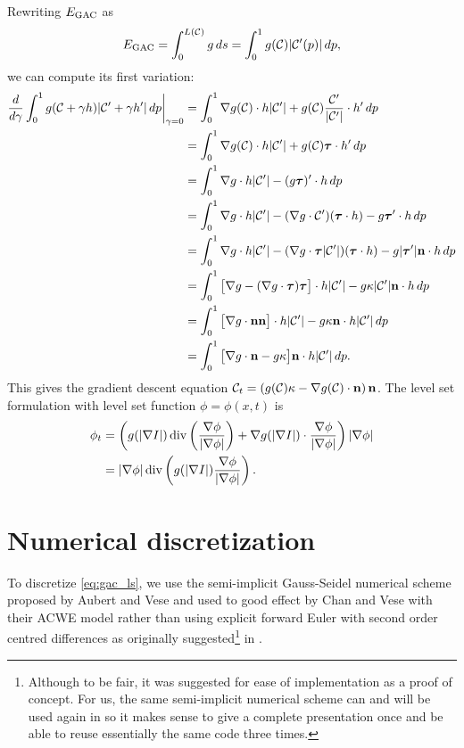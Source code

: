 Rewriting $E_\textrm{GAC}$ as 
\begin{align*}
E_\textrm{GAC} = \int^{L(\mathcal{C})}_0 g \, ds 
= \int^1_0 g(\mathcal{C}) \lvert\mathcal{C}'(p)\rvert \, dp ,
\end{align*} 
we can compute its first variation: 
\begin{align*}
\frac{d}{d\gamma} \int^1_0 g(\mathcal{C} + \gamma h) \lvert\mathcal{C}' + \gamma h'\rvert \, dp \bigg\rvert_{\gamma = 0}
&=  \int^1_0 \nabla g(\mathcal{C}) \cdot h \lvert\mathcal{C}'\rvert + g(\mathcal{C}) \frac{\mathcal{C}'}{\lvert\mathcal{C}'\rvert} \cdot h' \,dp 
\\
&=\int^1_0 \nabla g(\mathcal{C}) \cdot h \lvert\mathcal{C}'\rvert + g(\mathcal{C}) \boldsymbol{\tau} \cdot h' \,dp 
\\
&=\int^1_0 \nabla g \cdot h \lvert\mathcal{C}'\rvert - ( g \boldsymbol{\tau})' \cdot h \, dp
\\
&=\int^1_0 \nabla g \cdot h \lvert\mathcal{C}'\rvert - (\nabla g \cdot \mathcal{C}')(\boldsymbol{\tau} \cdot h) - g\boldsymbol{\tau} ' \cdot h \, dp
\\
&=\int^1_0 \nabla g \cdot h \lvert\mathcal{C}'\rvert - (\nabla g \cdot \boldsymbol{\tau} \lvert\mathcal{C}'\rvert )(\boldsymbol{\tau} \cdot h) - g\lvert\boldsymbol{\tau}'\rvert \mathbf{n} \cdot h \, dp
\\
&=\int^1_0 \big[ \nabla g  - (\nabla g \cdot \boldsymbol{\tau} )\boldsymbol{\tau} \big] \cdot h \lvert\mathcal{C}'\rvert - g\kappa \lvert\mathcal{C}'\rvert \mathbf{n} \cdot h \, dp
\\
&=\int^1_0 \big[\nabla g \cdot \mathbf{n} \mathbf{n} \big] \cdot h \lvert\mathcal{C}'\rvert - g\kappa  \mathbf{n} \cdot h \lvert\mathcal{C}'\rvert \, dp
\\
&=\int^1_0 \big[ \nabla g \cdot \mathbf{n} - g\kappa \big] \mathbf{n}  \cdot h \lvert\mathcal{C}'\rvert \, dp.
\\ 
\end{align*}
This gives the gradient descent equation $\mathcal{C}_t = \left( g(\mathcal{C}) \kappa - \nabla g(\mathcal{C}) \cdot \mathbf{n} \right) \mathbf{n} $.
The level set formulation with level set function $\phi = \phi(x, t)$ is
\begin{align}
\begin{split} 
\phi_t 
&= \left(
g( \lvert\nabla I \rvert ) \operatorname{div}\left( \frac{\nabla \phi}{\lvert\nabla \phi\rvert} \right)
	+  \nabla g(  \lvert\nabla I \rvert )\cdot  \frac{\nabla \phi}{\lvert\nabla \phi\rvert}
\right) \lvert \nabla \phi \rvert
\\
&= \lvert\nabla \phi\rvert \operatorname{div}\left( 
g(  \lvert\nabla I \rvert ) \frac{\nabla \phi}{\lvert\nabla \phi\rvert}
\right) .
\end{split}
\label{eq:gac_ls}
\end{align}

\section{Numerical discretization}
\label{sec:gac_num_disc}
To discretize \eqref{eq:gac_ls}, we use the semi-implicit Gauss-Seidel  numerical scheme proposed by Aubert and Vese \cite{aubert1997variational} and used to good effect by Chan and Vese with their ACWE model \cite{chan2001active} rather than using explicit forward Euler with second order centred differences as originally suggested\footnote{Although to be fair, it was suggested for ease of implementation as a proof of concept. For us, the same semi-implicit numerical scheme can and will be used again in  so it makes sense to give a complete presentation once and be able to reuse essentially the same code three times.} in \cite{caselles1997geodesic}.

